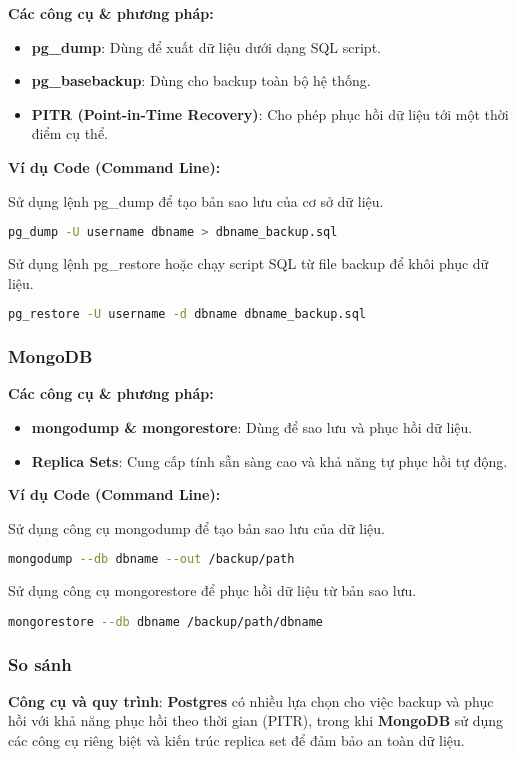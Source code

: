 \textbf{Các công cụ \& phương pháp:}
\begin{itemize}
    \item \textbf{pg\_dump}: Dùng để xuất dữ liệu dưới dạng SQL script.
    \item \textbf{pg\_basebackup}: Dùng cho backup toàn bộ hệ thống.
    \item \textbf{PITR (Point-in-Time Recovery)}: Cho phép phục hồi dữ liệu tới một thời điểm cụ thể.
\end{itemize}

\noindent
\textbf{Ví dụ Code (Command Line):}

Sử dụng lệnh pg\_dump để tạo bản sao lưu của cơ sở dữ liệu. 
\begin{lstlisting}[language=bash]
pg_dump -U username dbname > dbname_backup.sql
\end{lstlisting}

Sử dụng lệnh pg\_restore hoặc chạy script SQL từ file backup để khôi phục dữ liệu.
\begin{lstlisting}[language=bash]
pg_restore -U username -d dbname dbname_backup.sql
\end{lstlisting}



\subsubsection{MongoDB}

\textbf{Các công cụ \& phương pháp:}
\begin{itemize}
    \item \textbf{mongodump \& mongorestore}: Dùng để sao lưu và phục hồi dữ liệu.
    \item \textbf{Replica Sets}: Cung cấp tính sẵn sàng cao và khả năng tự phục hồi tự động.
\end{itemize}

\noindent
\textbf{Ví dụ Code (Command Line):}

Sử dụng công cụ mongodump để tạo bản sao lưu của dữ liệu.
\begin{lstlisting}[language=bash]
mongodump --db dbname --out /backup/path
\end{lstlisting}

Sử dụng công cụ mongorestore để phục hồi dữ liệu từ bản sao lưu.
\begin{lstlisting}[language=bash]
mongorestore --db dbname /backup/path/dbname
\end{lstlisting}

\subsubsection{So sánh}

\textbf{Công cụ và quy trình}: \textbf{Postgres} có nhiều lựa chọn cho việc backup và phục hồi với khả năng phục hồi theo thời gian (PITR), trong khi \textbf{MongoDB} sử dụng các công cụ riêng biệt và kiến trúc replica set để đảm bảo an toàn dữ liệu.
